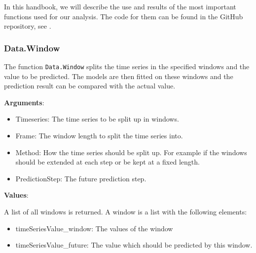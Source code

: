In this handbook, we will describe the use and results of the most important functions used for our analysis.  The code for them can be found in the GitHub repository, see \textcite{GitHub}. 

\subsubsection{Data.Window}
\label{sec: Data.Window}

The function \texttt{Data.Window} splits the time series in the specified windows and the value to be predicted. The models are then fitted on these windows and the prediction result can be compared with the actual value.

\textbf{Arguments}:

\begin{itemize}
	\item Timeseries: The time series to be split up in windows.
	\item Frame: The window length to split the time series into.
	\item Method: How the time series should be split up. For example if the windows should be extended at each step or be kept at a fixed length.
	\item PredictionStep: The future prediction step.
\end{itemize}

\textbf{Values}:

A list of all windows is returned. A window is a list with the following elements: 

\begin{itemize}
	\item timeSeriesValue\_window: The values of the window
	\item timeSeriesValue\_future: The value which should be predicted by this window. 
\end{itemize}

